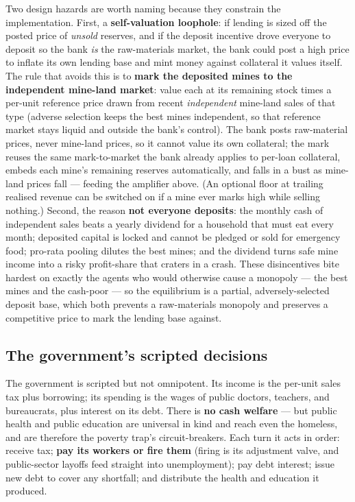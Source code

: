\documentclass[11pt]{article}
\begin{document}
Two design hazards are worth naming because they constrain the implementation.
First, a \textbf{self-valuation loophole}: if lending is sized off the posted
price of \emph{unsold} reserves, and if the deposit incentive drove everyone to
deposit so the bank \emph{is} the raw-materials market, the bank could post a
high price to inflate its own lending base and mint money against collateral it
values itself. The rule that avoids this is to \textbf{mark the deposited mines
to the independent mine-land market}: value each at its remaining stock times a
per-unit reference price drawn from recent \emph{independent} mine-land sales of
that type (adverse selection keeps the best mines independent, so that reference
market stays liquid and outside the bank's control). The bank posts
raw-material prices, never mine-land prices, so it cannot value its own
collateral; the mark reuses the same mark-to-market the bank already applies to
per-loan collateral, embeds each mine's remaining reserves automatically, and
falls in a bust as mine-land prices fall --- feeding the amplifier above. (An
optional floor at trailing realised revenue can be switched on if a mine ever
marks high while selling nothing.) Second, the
reason \textbf{not everyone deposits}: the monthly cash of independent sales
beats a yearly dividend for a household that must eat every month; deposited
capital is locked and cannot be pledged or sold for emergency food; pro-rata
pooling dilutes the best mines; and the dividend turns safe mine income into a
risky profit-share that craters in a crash. These disincentives bite hardest on
exactly the agents who would otherwise cause a monopoly --- the best mines and
the cash-poor --- so the equilibrium is a partial, adversely-selected deposit
base, which both prevents a raw-materials monopoly and preserves a competitive
price to mark the lending base against.

\subsection{The government's scripted decisions}
\label{sec:government}

The government is scripted but not omnipotent. Its income is the per-unit sales
tax plus borrowing; its spending is the wages of public doctors, teachers, and
bureaucrats, plus interest on its debt. There is \textbf{no cash welfare} ---
but public health and public education are universal in kind and reach even the
homeless, and are therefore the poverty trap's circuit-breakers. Each turn it
acts in order: receive tax; \textbf{pay its workers or fire them} (firing is its
adjustment valve, and public-sector layoffs feed straight into unemployment);
pay debt interest; issue new debt to cover any shortfall; and distribute the
health and education it produced.
\end{document}
